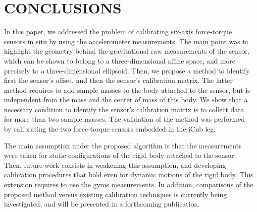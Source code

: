 \section{CONCLUSIONS}
\label{conclusions}
In this paper, we addressed the problem of calibrating six-axis force-torque sensors in situ by using the accelerometer measurements. 
The main point was to highlight the geometry behind the gravitational
raw measurements of the sensor, which can be shown to belong to a three-dimensional affine space, and more precisely to a three-dimensional ellipsoid.
Then, we propose a method to identify first the sensor's offset, and then the sensor's calibration matrix. The latter method requires to add sample masses
to the body attached to the sensor, but is independent from the mass and the center of mass of this body. We show that a necessary condition to identify the sensor's calibration matrix is to collect data for more than two 
sample masses. The validation of the method was performed by calibrating the two force-torque sensors embedded in the iCub leg.

The main assumption under the proposed algorithm is that the measurements were taken for static configurations of the rigid body attached to the sensor.
Then, future work consists in weakening this assumption, and developing calibration procedures that hold even for dynamic motions of the rigid body. This
extension requires to use the gyros measurements. In addition, comparisons of the proposed method versus existing calibration 
techniques is currently being investigated, and will be presented in a forthcoming publication.